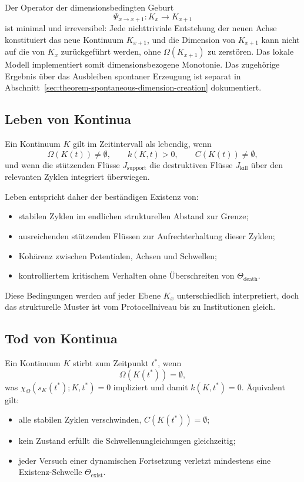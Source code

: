 Der Operator der dimensionsbedingten Geburt
\[
    \Psi_{x\to x+1}: K_x \to K_{x+1}
\]
ist minimal und irreversibel: Jede nichttriviale Entstehung der neuen Achse
konstituiert das neue Kontinuum \(K_{x+1}\), und die Dimension von
\(K_{x+1}\) kann nicht auf die von \(K_x\) zurückgeführt werden, ohne
\(\Omega(K_{x+1})\) zu zerstören.
Das lokale Modell implementiert somit dimensionsbezogene Monotonie. Das
zugehörige Ergebnis über das Ausbleiben spontaner Erzeugung ist separat in
Abschnitt~\ref{sec:theorem-spontaneous-dimension-creation} dokumentiert.

\subsection{Leben von Kontinua}

Ein Kontinuum \(K\) gilt im Zeitintervall als lebendig, wenn
\[
    \Omega(K(t)) \neq \emptyset,\qquad
    k(K,t) > 0,\qquad
    C(K(t)) \neq \emptyset,
\]
und wenn die stützenden Flüsse \(J_{\mathrm{support}}\) die destruktiven
Flüsse \(J_{\mathrm{kill}}\) über den relevanten Zyklen integriert überwiegen.

Leben entspricht daher der beständigen Existenz von:
\begin{itemize}
    \item stabilen Zyklen im endlichen strukturellen Abstand zur Grenze;
    \item ausreichenden stützenden Flüssen zur Aufrechterhaltung dieser Zyklen;
    \item Kohärenz zwischen Potentialen, Achsen und Schwellen;
    \item kontrolliertem kritischem Verhalten ohne Überschreiten von
          \(\Theta_{\mathrm{death}}\).
\end{itemize}

Diese Bedingungen werden auf jeder Ebene \(K_x\) unterschiedlich interpretiert,
doch das strukturelle Muster ist vom Protocellniveau bis zu Institutionen gleich.

\subsection{Tod von Kontinua}

Ein Kontinuum \(K\) stirbt zum Zeitpunkt \(t^\ast\), wenn
\[
    \Omega(K(t^\ast)) = \emptyset,
\]
was \(\chi_{\Omega}(s_K(t^\ast);K,t^\ast)=0\) impliziert und damit
\(k(K,t^\ast)=0\).
Äquivalent gilt:
\begin{itemize}
    \item alle stabilen Zyklen verschwinden, \(C(K(t^\ast)) = \emptyset\);
    \item kein Zustand erfüllt die Schwellenungleichungen gleichzeitig;
    \item jeder Versuch einer dynamischen Fortsetzung verletzt mindestens eine
          Existenz-Schwelle \(\Theta_{\mathrm{exist}}\).
\end{itemize}

